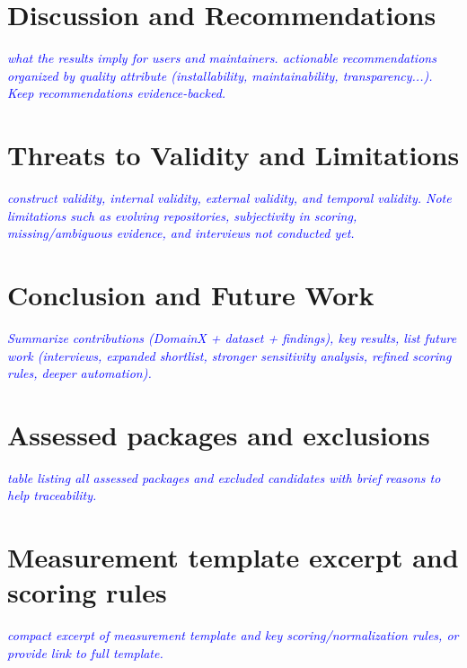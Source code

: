 \documentclass[final,1p,times,authoryear,12pt]{elsarticle}
\providecommand{\wss}[1]{\textcolor{blue}{\textit{#1}}}
\begin{document}
\section{Discussion and Recommendations}\label{discussion}
\wss{ what the results imply for users and maintainers. 
 actionable recommendations organized by quality attribute (installability, maintainability, transparency...). 
 Keep recommendations evidence-backed.}

\section{Threats to Validity and Limitations}\label{validity}
\wss{ construct validity, internal validity, external validity, and temporal validity. 
Note limitations such as evolving repositories, subjectivity in scoring, missing/ambiguous evidence,
 and interviews not conducted yet.}

\section{Conclusion and Future Work}\label{conclusion}
\wss{Summarize contributions (DomainX + dataset + findings), key results,  list future work 
(interviews, expanded shortlist, stronger sensitivity analysis, refined scoring rules, deeper automation).}

\appendix

\section{Assessed packages and exclusions}\label{app-packages}
\wss{table listing all assessed packages and excluded candidates with brief reasons to help traceability.}

\section{Measurement template excerpt and scoring rules}\label{app-template}
\wss{compact excerpt of measurement template and key scoring/normalization rules, or provide link to full template.}
\end{document}

